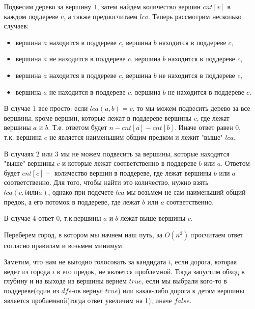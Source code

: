 \documentclass[12pt]{article}
\begin{document}

Подвесим дерево за вершину $1$, затем найдем количество вершин $cnt[v]$ в каждом поддереве $v$, а также предпосчитаем $lca$.
Теперь рассмотрим несколько случаев:
\begin{itemize}
	\item вершина $a$ находится в поддереве $c$, вершина $b$ находится в поддереве $c$,
	\item вершина $a$ не находится в поддереве $c$, вершина $b$ находится в поддереве $c$,
	\item вершина $a$ находится в поддереве $c$, вершина $b$ не находится в поддереве $c$,
	\item вершина $a$ не находится в поддереве $c$, вершина $b$ не находится в поддереве $c$.
\end{itemize}

В случае $1$ все просто: если $lca(a, b) = c$, то мы можем подвесить дерево за все
вершины, кроме вершин, которые лежат в поддереве вершины $c$, где лежат вершины $a$ и $b$.
Т.е. ответом будет $n - cnt[a] - cnt[b]$.
Иначе ответ равен $0$, т.к. вершина $c$ не является наименьшим общим предком и лежит "выше" $lca$.

В случаях $2$ или $3$ мы не можем подвесить за вершины, которые находятся "выше" вершины $c$ и которые лежат соответственно в поддереве $b$ или $a$.
Ответом будет $cnt[c] -$ количество вершин в поддереве, где лежат вершины $b$ или $a$ соответственно. Для того, чтобы найти это количество, нужно
взять $lca(c, b или a)$, однако при подсчете $lca$ мы возьмем не сам наименьший общий предок, а его потомок в поддереве, где лежат $b$ или $a$ соответственно.

В случае $4$ ответ $0$, т.к.вершины $a$ и $b$ лежат выше вершины $c$.

\EndEditorial
{}

Переберем город, в котором мы начнем наш путь, за $O(n^2)$ просчитаем ответ согласно правилам и возьмем минимум.
\EndEditorial
{}

Заметим, что нам не выгодно голосовать за кандидата $i$, если дорога, которая ведет из города $i$ в его предок, не является проблемной.
Тогда запустим обход в глубину и на выходе из вершины вернем $true$, если мы выбрали кого-то в поддереве(один из $dfs$-ов вернул $true$) или какая-либо дорога к детям
вершины является проблемной(тогда ответ увеличим на 1), иначе $false$.

\EndEditorial
\end{document}
